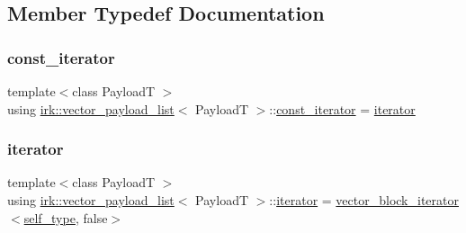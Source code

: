 \subsection{Member Typedef Documentation}
\mbox{\label{classirk_1_1vector__payload__list_abed614e4a2dad1f6ed890102297af020}} 
\subsubsection{\texorpdfstring{const\+\_\+iterator}{const\_iterator}}
{\footnotesize\ttfamily template$<$class PayloadT $>$ \\
using \mbox{\hyperlink{classirk_1_1vector__payload__list}{irk\+::vector\+\_\+payload\+\_\+list}}$<$ PayloadT $>$\+::\mbox{\hyperlink{classirk_1_1vector__payload__list_abed614e4a2dad1f6ed890102297af020}{const\+\_\+iterator}} =  \mbox{\hyperlink{classirk_1_1vector__payload__list_a33f425e324f556bba403c1700ff9915e}{iterator}}}

\mbox{\label{classirk_1_1vector__payload__list_a33f425e324f556bba403c1700ff9915e}} 
\subsubsection{\texorpdfstring{iterator}{iterator}}
{\footnotesize\ttfamily template$<$class PayloadT $>$ \\
using \mbox{\hyperlink{classirk_1_1vector__payload__list}{irk\+::vector\+\_\+payload\+\_\+list}}$<$ PayloadT $>$\+::\mbox{\hyperlink{classirk_1_1vector__payload__list_a33f425e324f556bba403c1700ff9915e}{iterator}} =  \mbox{\hyperlink{classirk_1_1vector__block__iterator}{vector\+\_\+block\+\_\+iterator}}$<$\mbox{\hyperlink{classirk_1_1vector__payload__list_a9312dea19fb0ee4e9c35e0def20e14d5}{self\+\_\+type}}, false$>$}

\mbox{\label{classirk_1_1vector__payload__list_a9312dea19fb0ee4e9c35e0def20e14d5}} 
